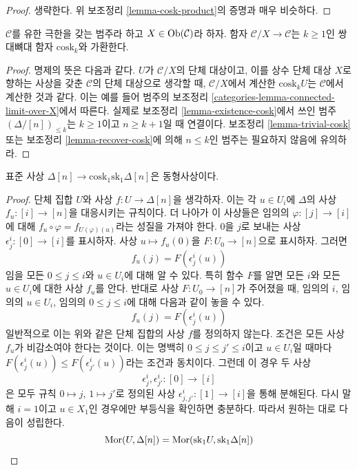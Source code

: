 \begin{proof}
생략한다. 위 보조정리 \ref{lemma-cosk-product}의 증명과 매우 비슷하다.
\end{proof}

\begin{lemma}
\label{lemma-cosk-above-object}
$\mathcal{C}$를 유한 극한을 갖는 범주라 하고 $X \in \mathop{\mathrm{Ob}}\nolimits(\mathcal{C})$라
하자. 함자 $\mathcal{C}/X \to \mathcal{C}$는 $k \geq 1$인 쌍대뼈대
함자 $\text{cosk}_k$와 가환한다.
\end{lemma}

\begin{proof}
명제의 뜻은 다음과 같다. $U$가 $\mathcal{C}/X$의 단체 대상이고, 이를
상수 단체 대상 $X$로 향하는 사상을 갖춘 $\mathcal{C}$의 단체 대상으로
생각할 때, $\mathcal{C}/X$에서 계산한 $\text{cosk}_k U$는
$\mathcal{C}$에서 계산한 것과 같다. 이는 예를 들어 범주의 보조정리
\ref{categories-lemma-connected-limit-over-X}에서 따른다. 실제로 보조정리
\ref{lemma-existence-cosk}에서 쓰인 범주 $(\Delta/[n])_{\leq k}$는
$k \geq 1$이고 $n \geq k + 1$일 때 연결이다. 보조정리
\ref{lemma-trivial-cosk} 또는 보조정리 \ref{lemma-recover-cosk}에 의해
$n \leq k$인 범주는 필요하지 않음에 유의하라.
\end{proof}

\begin{lemma}
\label{lemma-simplex-cosk}
표준 사상 $\Delta[n] \to \text{cosk}_1 \text{sk}_1 \Delta[n]$은
동형사상이다.
\end{lemma}

\begin{proof}
단체 집합 $U$와 사상 $f : U \to \Delta[n]$을 생각하자. 이는 각
$u \in U_i$에 $\Delta$의 사상 $f_u : [i] \to [n]$을 대응시키는 규칙이다.
더 나아가 이 사상들은 임의의 $\varphi : [j] \to [i]$에 대해
$f_u \circ \varphi = f_{U(\varphi)(u)}$라는 성질을 가져야 한다.
$0$을 $j$로 보내는 사상 $\epsilon^i_j : [0] \to [i]$를 표시하자.
사상 $u \mapsto f_u(0)$을 $F : U_0 \to [n]$으로 표시하자. 그러면
$$
f_u(j) = F(\epsilon^i_j(u))
$$
임을 모든 $0 \leq j \leq i$와 $u \in U_i$에 대해 알 수 있다.
특히 함수 $F$를 알면 모든 $i$와 모든 $u\in U_i$에 대한 사상 $f_u$를
안다. 반대로 사상 $F : U_0 \to [n]$가 주어졌을 때, 임의의 $i$,
임의의 $u \in U_i$, 임의의 $0 \leq j \leq i$에 대해 다음과 같이 놓을 수 있다.
$$
f_u(j) = F(\epsilon^i_j(u))
$$
일반적으로 이는 위와 같은 단체 집합의 사상 $f$를 정의하지 않는다.
조건은 모든 사상 $f_u$가 비감소여야 한다는 것이다. 이는 명백히
$0 \leq j \leq j' \leq i$이고 $u \in U_i$일 때마다
$F(\epsilon^i_j(u)) \leq F(\epsilon^i_{j'}(u))$라는 조건과 동치이다.
그런데 이 경우 두 사상
$$
\epsilon^i_j, \epsilon^i_{j'} : [0] \to [i]
$$
은 모두 규칙 $0 \mapsto j$, $1 \mapsto j'$로 정의된 사상
$\epsilon^i_{j, j'} : [1] \to [i]$을 통해 분해된다.
다시 말해 $i = 1$이고 $u \in X_1$인 경우에만 부등식을 확인하면
충분하다. 따라서 원하는 대로 다음이 성립한다.
$$
\mathop{\mathrm{Mor}}\nolimits(U, \Delta[n])
=
\mathop{\mathrm{Mor}}\nolimits(\text{sk}_1 U, \text{sk}_1 \Delta[n])
$$
\end{proof}



